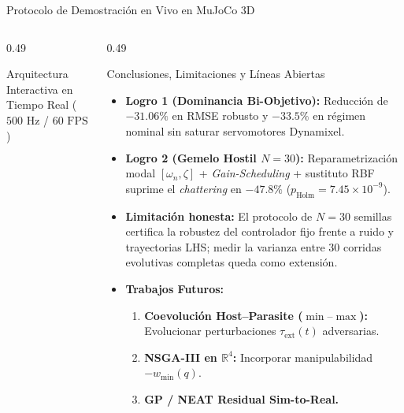 \documentclass[aspectratio=169,9pt]{beamer}
\begin{document}
\begin{frame}{Protocolo de Demostración en Vivo en MuJoCo 3D}
\begin{columns}[T,onlytextwidth]
\begin{column}{0.49\textwidth}
\begin{block}{\footnotesize Arquitectura Interactiva en Tiempo Real ($500\text{ Hz}$ / $60\text{ FPS}$)}
\begin{enumerate}
        \end{enumerate}
    \end{block}
\end{column}
\begin{column}{0.49\textwidth}
    \begin{exampleblock}{\footnotesize Conclusiones, Limitaciones y Líneas Abiertas}
        \scriptsize
        \begin{itemize}\setlength{\itemsep}{1pt}
            \item \textbf{Logro 1 (Dominancia Bi-Objetivo):} Reducción de $-31.06\%$ en RMSE robusto y $-33.5\%$ en régimen nominal sin saturar servomotores Dynamixel.
            \item \textbf{Logro 2 (Gemelo Hostil $N=30$):} Reparametrización modal $[\omega_n,\zeta]$ + \textit{Gain-Scheduling} + sustituto RBF suprime el \textit{chattering} en $\mathbf{-47.8\%}$ ($p_{\text{Holm}}=7.45\times 10^{-9}$).
            \item \textbf{Limitación honesta:} El protocolo de $N=30$ semillas certifica la robustez del controlador fijo frente a ruido y trayectorias LHS; medir la varianza entre 30 corridas evolutivas completas queda como extensión.
            \item \textbf{Trabajos Futuros:}
            \begin{enumerate}\setlength{\itemsep}{0.5pt}
                \item \scriptsize \textbf{Coevolución Host--Parasite ($\min\text{--}\max$):} Evolucionar perturbaciones $\tau_{\text{ext}}(t)$ adversarias.
                \item \scriptsize \textbf{NSGA-III en $\mathbb{R}^4$:} Incorporar manipulabilidad $-w_{\min}(q)$.
                \item \scriptsize \textbf{GP / NEAT Residual Sim-to-Real.}
            \end{enumerate}
        \end{itemize}
    \end{exampleblock}
\end{column}
\end{columns}
\end{frame}
\end{document}
